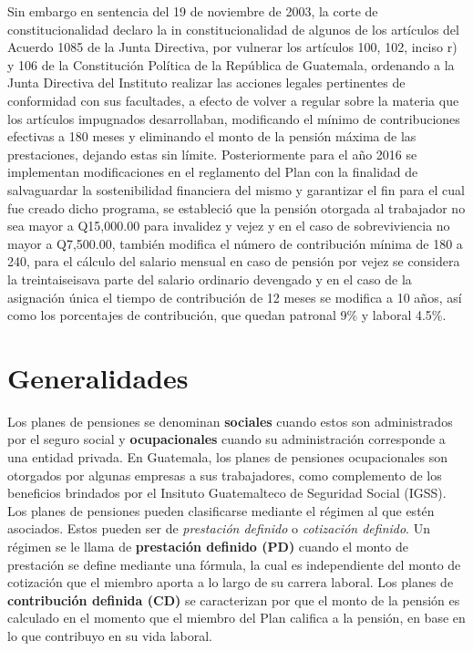 \documentclass[12pt,letterpaper,titlepage]{article}
\begin{document}
{Sin embargo en sentencia del 19 de noviembre de 2003, la corte de constitucionalidad declaro la in constitucionalidad de algunos de los artículos del Acuerdo 1085 de la Junta Directiva, por vulnerar los artículos 100, 102, inciso r) y 106 de la Constitución Política de la República de Guatemala, ordenando a la Junta Directiva del Instituto realizar las acciones legales pertinentes de conformidad con sus facultades, a efecto de volver a regular sobre la materia que los artículos impugnados desarrollaban, modificando el mínimo de contribuciones efectivas a 180 meses y eliminando el monto de la pensión máxima de las prestaciones, dejando estas sin límite. Posteriormente para el año 2016 se implementan modificaciones en el reglamento del Plan con la finalidad de salvaguardar la sostenibilidad financiera del mismo y garantizar el fin para el cual fue creado dicho programa, se estableció que la pensión otorgada al trabajador no sea mayor  a Q15,000.00 para invalidez y vejez y en el caso de sobreviviencia no mayor a Q7,500.00, también modifica el número de contribución mínima de 180 a 240, para el cálculo del salario mensual en caso de pensión por vejez se considera la treintaiseisava parte del salario ordinario devengado y en el caso de la asignación única el tiempo de contribución de 12 meses se modifica a 10 años, así  como los porcentajes de contribución, que  quedan patronal 9\% y laboral 4.5\%.



\newpage
\section{Generalidades}
Los planes de pensiones se denominan \textbf{sociales} cuando estos son administrados por el seguro social y \textbf{ocupacionales} cuando su administración corresponde a una entidad privada.  En Guatemala, los planes de pensiones ocupacionales son otorgados por algunas empresas a sus trabajadores, como complemento de los beneficios brindados por el Insituto Guatemalteco de Seguridad Social (IGSS). \\

Los planes de pensiones pueden clasificarse mediante el régimen al que estén asociados. Estos pueden ser de \textit{prestación definido} o \textit{cotización definido}. Un régimen se le llama de \textbf{prestación definido (PD)} cuando el monto de prestación se define mediante una fórmula, la cual es independiente del monto de cotización que el miembro aporta a lo largo de su carrera laboral. Los planes de \textbf{contribución definida (CD)} se caracterizan por que el monto de la pensión es calculado en el momento que el miembro del Plan califica a la pensión, en base en lo que contribuyo en su vida laboral. \\

}
\end{document}
